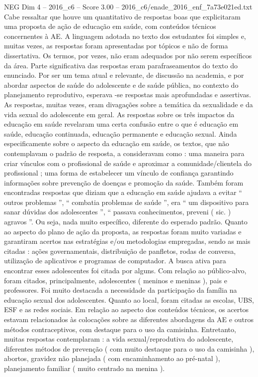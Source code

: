 \begin{textsample}{NEG Dim 4 – 2016\_c6 – Score 3.00 – 2016\_c6/enade\_2016\_enf\_7a73e021ed.txt}
Cabe ressaltar que houve um quantitativo de respostas boas que explicitaram uma proposta de ação de educação em saúde, com conteúdos técnicos concernentes à AE.
A linguagem adotada no texto dos estudantes foi simples e, muitas vezes, as respostas foram apresentadas por tópicos e não de forma dissertativa.
Os termos, por vezes, não eram adequados por não serem específicos da área.
Parte significativa das respostas eram parafraseamentos do texto do enunciado.
Por ser um tema atual e relevante, de discussão na academia, e por abordar aspectos de saúde do adolescente e de saúde pública, no contexto do planejamento reprodutivo, esperava -se respostas mais aprofundadas e assertivas.
As respostas, muitas vezes, eram divagações sobre a temática da sexualidade e da vida sexual do adolescente em geral.
As respostas sobre os três impactos da educação em saúde revelaram uma certa confusão entre o que é educação em saúde, educação continuada, educação permanente e educação sexual.
Ainda especificamente sobre o aspecto da educação em saúde, os textos, que não contemplavam o padrão de resposta, a consideravam como : uma maneira para criar vínculos com o profissional de saúde e aproximar a comunidade/clientela do profissional ; uma forma de estabelecer um vínculo de confiança garantindo informações sobre prevenção de doenças e promoção da saúde.
Também foram encontradas respostas que diziam que a educação em saúde ajudava a evitar “ outros problemas ”, “ combatia problemas de saúde ”, era “ um dispositivo para sanar dúvidas dos adolescentes ”, “ passava conhecimentos, preveni ( sic. ) agravos ”.
Ou seja, nada muito específico, diferente do esperado padrão.
Quanto ao aspecto do plano de ação da proposta, as respostas foram muito variadas e garantiram acertos nas estratégias e/ou metodologias empregadas, sendo as mais citadas : ações governamentais, distribuição de panfletos, rodas de conversa, utilização de aplicativos e programas de computador.
A busca ativa para encontrar esses adolescentes foi citada por alguns.
Com relação ao público-alvo, foram citados, principalmente, adolescentes ( meninos e meninas ), pais e professores.
Foi muito destacada a necessidade da participação da família na educação sexual dos adolescentes.
Quanto ao local, foram citadas as escolas, UBS, ESF e as redes sociais.
Em relação ao aspecto dos conteúdos técnicos, os acertos estavam relacionados às colocações sobre as diferentes abordagens da AE e outros métodos contraceptivos, com destaque para o uso da camisinha.
Entretanto, muitas respostas contemplaram : a vida sexual/reprodutiva do adolescente, diferentes métodos de prevenção ( com muito destaque para o uso da camisinha ), abortos, gravidez não planejada ( com encaminhamento ao pré-natal ), planejamento familiar ( muito centrado na menina ).

\end{textsample}
